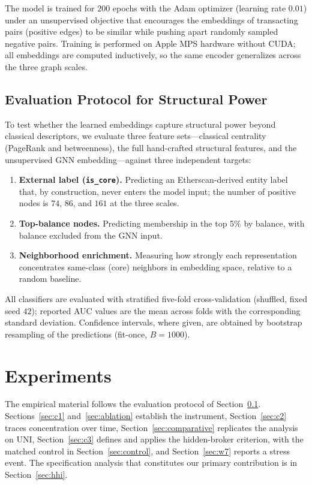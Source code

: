 \documentclass[final,5p,times]{elsarticle}
\begin{document}
The model is trained for $200$ epochs with the Adam optimizer (learning
rate $0.01$) under an unsupervised objective that encourages the embeddings
of transacting pairs (positive edges) to be similar while pushing apart
randomly sampled negative pairs. Training is performed on Apple MPS
hardware without CUDA; all embeddings are computed inductively, so the same
encoder generalizes across the three graph scales.

\subsection{Evaluation Protocol for Structural Power}
\label{sec:measures}
To test whether the learned embeddings capture structural power beyond
classical descriptors, we evaluate three feature sets---classical
centrality (PageRank and betweenness), the full hand-crafted structural
features, and the unsupervised GNN embedding---against three independent
targets:
\begin{enumerate}
    \item \textbf{External label (\texttt{is\_core}).} Predicting an
    Etherscan-derived entity label that, by construction, never enters the
    model input; the number of positive nodes is $74$, $86$, and $161$ at
    the three scales.
    \item \textbf{Top-balance nodes.} Predicting membership in the top 5\%
    by balance, with balance excluded from the GNN input.
    \item \textbf{Neighborhood enrichment.} Measuring how strongly each
    representation concentrates same-class (core) neighbors in embedding
    space, relative to a random baseline.
\end{enumerate}
All classifiers are evaluated with stratified five-fold cross-validation
(shuffled, fixed seed $42$); reported AUC values are the mean across folds
with the corresponding standard deviation. Confidence intervals, where
given, are obtained by bootstrap resampling of the predictions (fit-once,
$B = 1000$).


\section{Experiments}
\label{sec:exp}

The empirical material follows the evaluation protocol of
Section~\ref{sec:measures}. Sections~\ref{sec:c1} and~\ref{sec:ablation}
establish the instrument, Section~\ref{sec:c2} traces concentration over
time, Section~\ref{sec:comparative} replicates the analysis on UNI,
Section~\ref{sec:c3} defines and applies the hidden-broker criterion,
with the matched control in Section~\ref{sec:control}, and
Section~\ref{sec:w7} reports a stress event. The specification analysis
that constitutes our primary contribution is in Section~\ref{sec:hhi}.
\end{document}
